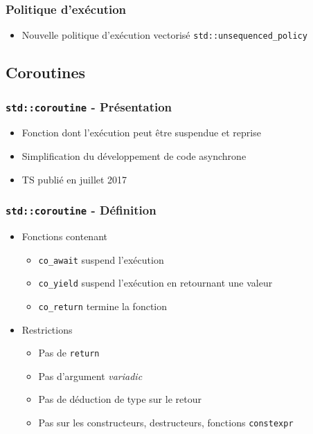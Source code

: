 \documentclass[C++.tex]{subfiles}
\begin{document}
\begin{frame}[fragile]
	\frametitle{Politique d'exécution}
	\begin{itemize}
		\item Nouvelle politique d'exécution vectorisé \lstinline|std::unsequenced_policy|
	\end{itemize}
\end{frame}

\subsection*{Coroutines}
\begin{frame}[fragile]
	\frametitle{\lstinline|std::coroutine| - Présentation}
	\begin{itemize}
		\item Fonction dont l'exécution peut être suspendue et reprise
		\item Simplification du développement de code asynchrone
		\item TS publié en juillet 2017
	\end{itemize}
\end{frame}

\begin{frame}[fragile]
	\frametitle{\lstinline|std::coroutine| - Définition}
	\begin{itemize}
		\item Fonctions contenant
		\begin{itemize}
			\item \lstinline|co_await| suspend l'exécution
			\item \lstinline|co_yield| suspend l'exécution en retournant une valeur
			\item \lstinline|co_return| termine la fonction
		\end{itemize}

		\item Restrictions
		\begin{itemize}
			\item Pas de \lstinline|return|
			\item Pas d'argument \textit{variadic}
			
			
			\item Pas de déduction de type sur le retour
			
			
			\item Pas sur les constructeurs, destructeurs, fonctions \lstinline|constexpr|
		\end{itemize}

	\end{itemize}
\end{frame}
\end{document}
